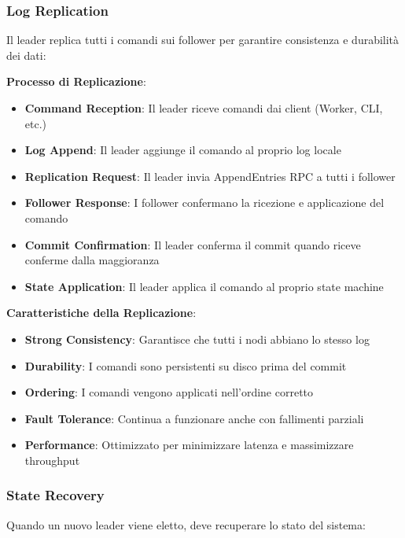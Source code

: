 \documentclass[12pt,a4paper]{article}
\begin{document}
\subsubsection{Log Replication}

Il leader replica tutti i comandi sui follower per garantire consistenza e durabilità dei dati:

\textbf{Processo di Replicazione}:
\begin{itemize}
\item \textbf{Command Reception}: Il leader riceve comandi dai client (Worker, CLI, etc.)
\item \textbf{Log Append}: Il leader aggiunge il comando al proprio log locale
\item \textbf{Replication Request}: Il leader invia AppendEntries RPC a tutti i follower
\item \textbf{Follower Response}: I follower confermano la ricezione e applicazione del comando
\item \textbf{Commit Confirmation}: Il leader conferma il commit quando riceve conferme dalla maggioranza
\item \textbf{State Application}: Il leader applica il comando al proprio state machine
\end{itemize}

\textbf{Caratteristiche della Replicazione}:
\begin{itemize}
\item \textbf{Strong Consistency}: Garantisce che tutti i nodi abbiano lo stesso log
\item \textbf{Durability}: I comandi sono persistenti su disco prima del commit
\item \textbf{Ordering}: I comandi vengono applicati nell'ordine corretto
\item \textbf{Fault Tolerance}: Continua a funzionare anche con fallimenti parziali
\item \textbf{Performance}: Ottimizzato per minimizzare latenza e massimizzare throughput
\end{itemize}

\subsubsection{State Recovery}

Quando un nuovo leader viene eletto, deve recuperare lo stato del sistema:
\end{document}
